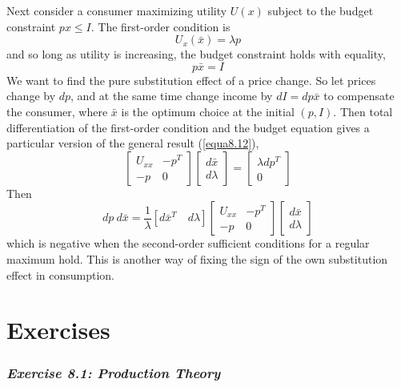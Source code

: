 Next consider a consumer maximizing utility $U(x)$ subject to the budget constraint $px \leq I$. The first-order condition is 
\begin{equation*}   
   U_x(\bar{x} ) = \lambda p
\end{equation*}
and so long as utility is increasing, the budget constraint holds with equality, 
\begin{equation*}   
  p\bar{x}  = I
\end{equation*}
We want to find the pure substitution effect of a price change. So let prices change by $dp$, and at the same time change income by $dI = dp \bar{x}$ to compensate the consumer, where $\bar{x}$ is the optimum choice at the initial $(p, I)$. Then total differentiation of the first-order condition and the budget equation gives a particular version of the general result (\ref{equa8.12}),
\begin{equation*}
\left[
\begin{array}{cc}
    U_{xx} & -p^T \\ -p & 0   
\end{array}
\right] 
\left[ \begin{array}{c}
 d \bar{x} \\ d \lambda
\end{array}   \right] = 
\left[ \begin{array}{c}
 \lambda d p^T \\ 0
\end{array}   \right]
\end{equation*}
Then 
\begin{equation*}
dp \ d \bar{x}  = \dfrac{1}{\lambda}[ d \bar{x}^T \quad d \lambda ]
\left[
\begin{array}{cc}
    U_{xx} & -p^T \\ -p & 0   
\end{array}
\right] 
\left[ \begin{array}{c}
 d \bar{x} \\ d \lambda
\end{array}   \right] 
\end{equation*}
which is negative when the second-order sufficient conditions for a regular maximum hold. This is another way of fixing the sign of the own substitution effect in consumption.

\section*{Exercises}

\subsubsection*{\textit{Exercise 8.1: Production Theory}}


